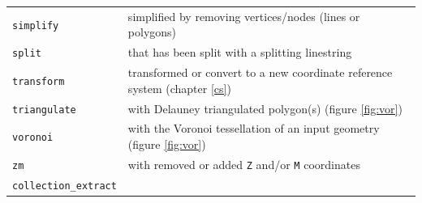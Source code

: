 \documentclass[]{book}
\begin{document}
\begin{longtable}[]{@{}ll@{}}
\begin{minipage}[t]{0.23\columnwidth}\raggedright
\texttt{simplify}\strut
\end{minipage} & \begin{minipage}[t]{0.71\columnwidth}\raggedright
simplified by removing vertices/nodes (lines or polygons)\strut
\end{minipage}\tabularnewline
\begin{minipage}[t]{0.23\columnwidth}\raggedright
\texttt{split}\strut
\end{minipage} & \begin{minipage}[t]{0.71\columnwidth}\raggedright
that has been split with a splitting linestring\strut
\end{minipage}\tabularnewline
\begin{minipage}[t]{0.23\columnwidth}\raggedright
\texttt{transform}\strut
\end{minipage} & \begin{minipage}[t]{0.71\columnwidth}\raggedright
transformed or convert to a new coordinate reference system (chapter \ref{cs})\strut
\end{minipage}\tabularnewline
\begin{minipage}[t]{0.23\columnwidth}\raggedright
\texttt{triangulate}\strut
\end{minipage} & \begin{minipage}[t]{0.71\columnwidth}\raggedright
with Delauney triangulated polygon(s) (figure \ref{fig:vor})\strut
\end{minipage}\tabularnewline
\begin{minipage}[t]{0.23\columnwidth}\raggedright
\texttt{voronoi}\strut
\end{minipage} & \begin{minipage}[t]{0.71\columnwidth}\raggedright
with the Voronoi tessellation of an input geometry (figure \ref{fig:vor})\strut
\end{minipage}\tabularnewline
\begin{minipage}[t]{0.23\columnwidth}\raggedright
\texttt{zm}\strut
\end{minipage} & \begin{minipage}[t]{0.71\columnwidth}\raggedright
with removed or added \texttt{Z} and/or \texttt{M} coordinates\strut
\end{minipage}\tabularnewline
\begin{minipage}[t]{0.23\columnwidth}\raggedright
\texttt{collection\_extract}\strut
\end{minipage} & \begin{minipage}[t]{0.71\columnwidth}\raggedright

\end{minipage}
\end{longtable}
\end{document}
